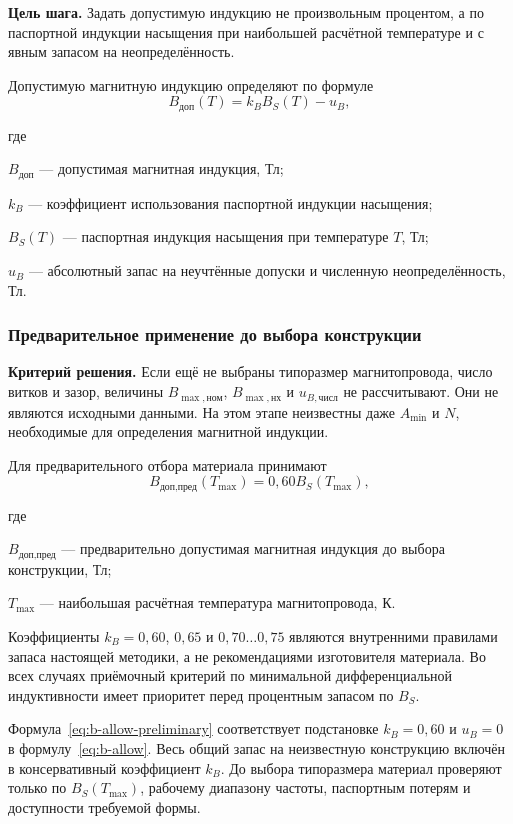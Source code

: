 \documentclass[14pt,a4paper]{extarticle}
\newcommand{\criterion}{\par\noindent\textbf{Критерий решения.} }
\newcommand{\stepgoal}[1]{\par\noindent\textbf{Цель шага.} #1\par}
\newenvironment{whereblock}
 {\par\noindent где\par
  \begin{list}{}{\setlength{\leftmargin}{12.5mm}
                  \setlength{\itemindent}{-12.5mm}
                  \setlength{\itemsep}{0pt}
                  \setlength{\parsep}{0pt}
                  \setlength{\topsep}{0pt}}}
 {\end{list}}
\newcommand{\whereitem}[2]{\item[] #1 --- #2}
\begin{document}
\stepgoal{Задать допустимую индукцию не произвольным процентом, а по
паспортной индукции насыщения при наибольшей расчётной температуре и с
явным запасом на неопределённость.}

Допустимую магнитную индукцию определяют по формуле
\begin{equation}
 B_{\text{доп}}(T)=k_B B_S(T)-u_B,
 \label{eq:b-allow}
\end{equation}
\begin{whereblock}
\whereitem{$B_{\text{доп}}$}{допустимая магнитная индукция, Тл;}
\whereitem{$k_B$}{коэффициент использования паспортной индукции насыщения;}
\whereitem{$B_S(T)$}{паспортная индукция насыщения при температуре $T$, Тл;}
\whereitem{$u_B$}{абсолютный запас на неучтённые допуски и численную
неопределённость, Тл.}
\end{whereblock}

\subsubsection{Предварительное применение до выбора конструкции}

\criterion Если ещё не выбраны типоразмер магнитопровода, число витков и
зазор, величины $B_{\max,\text{ном}}$, $B_{\max,\text{нх}}$ и
$u_{B,\text{числ}}$ не рассчитывают. Они не являются исходными данными.
На этом этапе неизвестны даже $A_{\min}$ и $N$, необходимые для
определения магнитной индукции.

Для предварительного отбора материала принимают
\begin{equation}
 B_{\text{доп,пред}}(T_{\max})=
 0{,}60 B_S(T_{\max}),
 \label{eq:b-allow-preliminary}
\end{equation}
\begin{whereblock}
\whereitem{$B_{\text{доп,пред}}$}{предварительно допустимая магнитная
индукция до выбора конструкции, Тл;}
\whereitem{$T_{\max}$}{наибольшая расчётная температура
магнитопровода, К.}
\end{whereblock}

Коэффициенты $k_B=0{,}60$, $0{,}65$ и $0{,}70\ldots0{,}75$ являются
внутренними правилами запаса настоящей методики, а не рекомендациями
изготовителя материала. Во всех случаях приёмочный критерий по минимальной
дифференциальной индуктивности имеет приоритет перед процентным запасом по
$B_S$.

Формула~\eqref{eq:b-allow-preliminary} соответствует подстановке
$k_B=0{,}60$ и $u_B=0$ в формулу~\eqref{eq:b-allow}. Весь общий запас
на неизвестную конструкцию включён в консервативный коэффициент $k_B$.
До выбора типоразмера материал проверяют только по
$B_S(T_{\max})$, рабочему диапазону частоты, паспортным потерям и
доступности требуемой формы.
\end{document}
